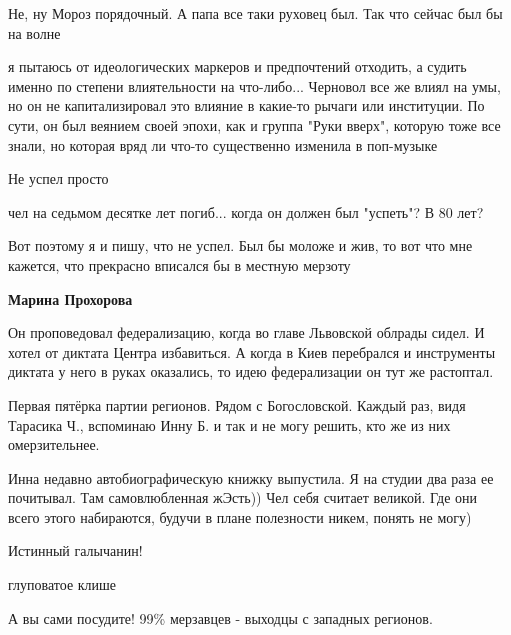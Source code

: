 \begin{itemize}
\begin{itemize}
Не, ну Мороз порядочный. А папа все таки руховец был. Так что сейчас был бы на волне


я пытаюсь от идеологических маркеров и предпочтений отходить, а судить именно
по степени влиятельности на что-либо... Черновол все же влиял на умы, но он не
капитализировал это влияние в какие-то рычаги или институции. По сути, он был
веянием своей эпохи, как и группа "Руки вверх", которую тоже все знали, но
которая вряд ли что-то существенно изменила в поп-музыке

Не успел просто

чел на седьмом десятке лет погиб... когда он должен был "успеть"? В 80 лет?

Вот поэтому я и пишу, что не успел. Был бы моложе и жив, то вот что мне кажется, что прекрасно вписался бы в местную мерзоту

\textbf{Марина Прохорова} 

Он проповедовал федерализацию, когда во главе Львовской облрады сидел. И хотел
от диктата Центра избавиться. А когда в Киев перебрался и инструменты диктата у
него в руках оказались, то идею федерализации он тут же растоптал.

\end{itemize} %


Первая пятёрка партии регионов. Рядом с Богословской. Каждый раз, видя Тарасика
Ч., вспоминаю Инну Б. и так и не могу решить, кто же из них омерзительнее.

\begin{itemize} %

Инна недавно автобиографическую книжку выпустила. Я на студии два раза ее
почитывал. Там самовлюбленная жЭсть)) Чел себя считает великой. Где они всего
этого набираются, будучи в плане полезности никем, понять не могу)

\end{itemize} %

Истинный галычанин!

\begin{itemize} %
глуповатое клише

А вы сами посудите! 99\% мерзавцев - выходцы с западных регионов.



\end{itemize}
\end{itemize}

